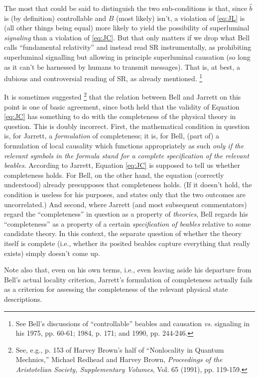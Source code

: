 \documentclass[aps,prc,twocolumn]{revtex4}
\begin{document}
The most that could be said to distinguish the two sub-conditions is that,
since $\hat{b}$ is (by definition) controllable and $B$ (most likely) 
isn't, a violation of \ref{eq:JL} is (all other things being equal) 
more likely to yield the possibility of superluminal \emph{signaling}
than a violation of \ref{eq:JC}.  But that only matters if we drop
what Bell calls ``fundamental relativity'' and instead read SR
instrumentally, as prohibiting superluminal signalling but allowing in
principle superluminal causation (so long as it can't be harnessed by
humans to transmit messages).   That is, at best, a dubious and 
controversial reading of SR, as already mentioned.  \footnote{See Bell's
discussions of ``controllable'' beables and causation \emph{vs.} 
signaling in his 1975, pp. 60-61; 1984, p. 171; and 1990, pp. 244-246.}

It is sometimes suggested 
\footnote{See, e.g., p. 153 of Harvey Brown's half of ``Nonlocality in Quantum
  Mechnics,''  Michael Redhead and Harvey Brown, \emph{Proceedings of
    the Aristotelian Society, Supplementary Volumes}, Vol. 65 (1991),
  pp. 119-159.}
that the relation between Bell and Jarrett
on this point is one of basic agreement, since both held that the
validity of Equation \ref{eq:JC}
has something to do with the completeness of the physical theory in
question.  This is doubly incorrect.  First, the mathematical
condition in question is, for Jarrett, a \emph{formulation} of
completeness; it is, for Bell, (part of) a formulation of local
causality which functions appropriately as such \emph{only if the 
relevant symbols in the formula stand for a complete specification 
of the relevant beables}.  According to Jarrett, Equation \ref{eq:JC} is
supposed to tell us whether completeness holds.  For Bell, on the
other hand, the equation (correctly understood) already presupposes
that completeness holds.  (If it doesn't hold, the condition is useless for
his purposes, and states only that the two outcomes are uncorrelated.)  
And second, where Jarrett (and most subsequent commentators)
regard the ``completeness'' in question as a property of
\emph{theories}, Bell regards his ``completeness'' as a property of a
certain \emph{specification of beables} relative to some candidate
theory.  In this context, the separate question of whether the theory
itself is complete (i.e., whether its posited beables capture
everything that really exists) simply doesn't come up.

Note also that, even on his own terms, i.e., even leaving aside his 
departure from Bell's actual
locality criterion, Jarrett's formulation of completeness actually
fails as a criterion for assessing the completeness of the relevant
physical state descriptions.
\end{document}
